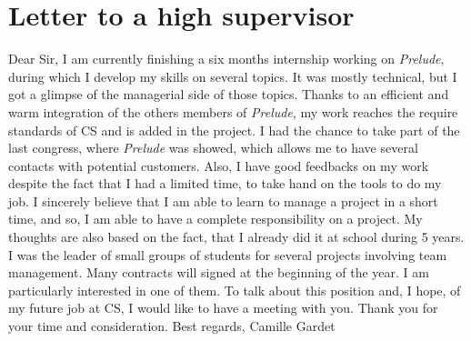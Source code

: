 \documentclass{koala-en}
\begin{document}
\thispagestyle{fancy}

\part{Letter to a high supervisor}
Dear Sir,
\newline
\newline
I am currently finishing a six months internship working on \emph{Prelude}, during which I develop my skills on several topics. It was mostly technical, but I got a glimpse of the managerial side of those topics.
\newline
\newline
Thanks to an efficient and warm integration of the others members of \emph{Prelude}, my work reaches the require standards of CS and
is added in the project. I had the chance to take part of the last congress, where \emph{Prelude} was showed, which allows me to have several contacts with potential customers.
\newline
Also, I have good feedbacks on my work despite the fact that I had a limited time, to take hand on the tools to do my job. I sincerely believe that I am able to learn to manage a project in a short time, and so, I am able to have a complete responsibility on a project. My thoughts are also based on the fact, that I already did it at school during 5 years. I was the leader of small groups of students for several projects involving team management.
\newline
\newline
Many contracts will signed at the beginning of the year. I am particularly interested in one of them.
\newline
\newline
To talk about this position and, I hope, of my future job at CS, I would like to have a meeting with you.
\newline
\newline
Thank you for your time and consideration.
\newline
\newline
Best regards,\newline
Camille Gardet

\thispagestyle{fancy}
\end{document}
